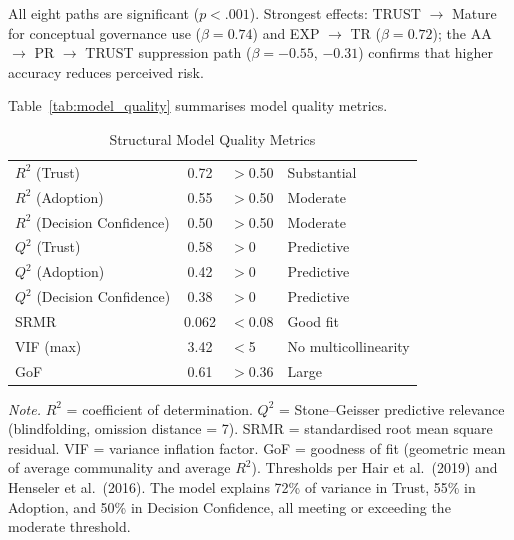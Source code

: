 \vspace{1em}

All eight paths are significant ($p < .001$). Strongest effects: TRUST $\to$ Mature for conceptual governance use ($\beta = 0.74$) and EXP $\to$ TR ($\beta = 0.72$); the AA $\to$ PR $\to$ TRUST suppression path ($\beta = -0.55$, $-0.31$) confirms that higher accuracy reduces perceived risk.


Table~\ref{tab:model_quality} summarises model quality metrics.

\begin{table}[!htbp]
\tablestripes
\caption{Structural Model Quality Metrics}
\tablefontsize
\begin{tabularx}{\textwidth}{@{} >{\raggedright\arraybackslash}p{4.5cm} C >{\raggedright\arraybackslash}p{2.5cm} L @{}}
\toprule
{} &  &  &  \\
\midrule
$R^2$ (Trust) & 0.72 & $>$0.50 & Substantial \\
$R^2$ (Adoption) & 0.55 & $>$0.50 & Moderate \\
$R^2$ (Decision Confidence) & 0.50 & $>$0.50 & Moderate \\
\addlinespace
$Q^2$ (Trust) & 0.58 & $>$0 & Predictive \\
$Q^2$ (Adoption) & 0.42 & $>$0 & Predictive \\
$Q^2$ (Decision Confidence) & 0.38 & $>$0 & Predictive \\
\addlinespace
SRMR & 0.062 & $<$0.08 & Good fit \\
VIF (max) & 3.42 & $<$5 & No multicollinearity \\
GoF & 0.61 & $>$0.36 & Large \\
\bottomrule
\end{tabularx}
\vspace{0.5em}\noindent\textit{Note.} $R^2$ = coefficient of determination. $Q^2$ = Stone--Geisser predictive relevance (blindfolding, omission distance = 7). SRMR = standardised root mean square residual. VIF = variance inflation factor. GoF = goodness of fit (geometric mean of average communality and average $R^2$). Thresholds per Hair et al.\ (2019) and Henseler et al.\ (2016). The model explains 72\% of variance in Trust, 55\% in Adoption, and 50\% in Decision Confidence, all meeting or exceeding the moderate threshold.
\end{table}
\fi %


